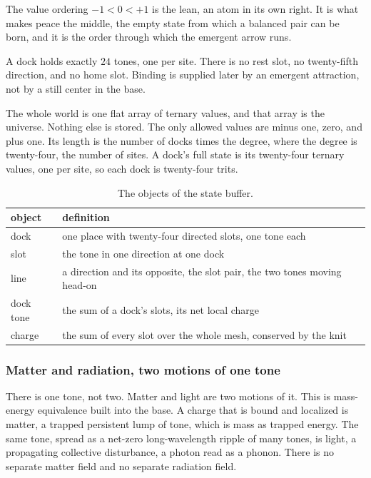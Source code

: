 The value ordering $-1 < 0 < +1$ is the lean, an atom in its own right. It is what makes peace the middle, the empty state from which a balanced pair can be born, and it is the order through which the emergent arrow runs.

\begin{result}
A dock holds exactly $24$ tones, one per site. There is no rest slot, no twenty-fifth direction, and no home slot. Binding is supplied later by an emergent attraction, not by a still center in the base.
\end{result}

The whole world is one flat array of ternary values, and that array is the universe. Nothing else is stored. The only allowed values are minus one, zero, and plus one. Its length is the number of docks times the degree, where the degree is twenty-four, the number of sites. A dock's full state is its twenty-four ternary values, one per site, so each dock is twenty-four trits.

\begin{table}[ht]
\centering
\begin{tabular}{@{}ll@{}}
\toprule
object & definition \\
\midrule
dock & one place with twenty-four directed slots, one tone each \\
slot & the tone in one direction at one dock \\
line & a direction and its opposite, the slot pair, the two tones moving head-on \\
dock tone & the sum of a dock's slots, its net local charge \\
charge & the sum of every slot over the whole mesh, conserved by the knit \\
\bottomrule
\end{tabular}
\caption{The objects of the state buffer.}
\label{tab:buffer}
\end{table}

\subsubsection{Matter and radiation, two motions of one tone}

There is one tone, not two. Matter and light are two motions of it. This is mass-energy equivalence built into the base. A charge that is bound and localized is matter, a trapped persistent lump of tone, which is mass as trapped energy. The same tone, spread as a net-zero long-wavelength ripple of many tones, is light, a propagating collective disturbance, a photon read as a phonon. There is no separate matter field and no separate radiation field.

